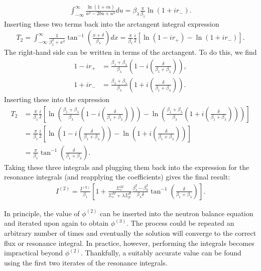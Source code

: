\begin{align}
  \int_{-\infty}^\infty \frac{\ln( 1 + iu)}{a^2 - 2bu + u^2} du  = \beta_\lambda \frac{\pi}{\beta_1} \ln( 1 + i r_- ) .
\end{align}
Inserting these two terms back into the arctangent integral expression
\begin{align}
  T_2 = \int_{-\infty}^\infty \frac{1}{\beta_1^2 + x^2} \tan^{-1} \left( \frac{x + \delta}{\beta_\lambda} \right) dx
  = \frac{\pi}{\beta_1} \frac{i}{2} \left[ \ln( 1 - i r_+ ) - \ln( 1 + i r_- ) \right] .
\end{align}
The right-hand side can be written in terms of the arctangent. To do this, we find
\begin{align}
  1 - i r_+ &= \frac{\beta_1 + \beta_\lambda}{\beta_\lambda} \left( 1 - i \left( \frac{\delta}{\beta_1 + \beta_\lambda} \right) \right), \nonumber \\
  1 + i r_- &= \frac{\beta_1 + \beta_\lambda}{\beta_\lambda} \left( 1 + i \left( \frac{\delta}{\beta_1 + \beta_\lambda} \right) \right). \nonumber
\end{align}
Inserting these into the expression
\begin{align}
  T_2 
  &= \frac{\pi}{\beta_1} \frac{i}{2} \left[ 
    \ln\left( \frac{\beta_1 + \beta_\lambda}{\beta_\lambda} \left( 1 - i \left( \frac{\delta}{\beta_1 + \beta_\lambda} \right) \right) \right)
  - \ln\left( \frac{\beta_1 + \beta_\lambda}{\beta_\lambda} \left( 1 + i \left( \frac{\delta}{\beta_1 + \beta_\lambda} \right) \right) \right)  \right] \nonumber \\
  &= \frac{\pi}{\beta_1} \frac{i}{2} \left[ 
    \ln\left( 1 - i \left( \frac{\delta}{\beta_1 + \beta_\lambda} \right) \right)
  - \ln\left( 1 + i \left( \frac{\delta}{\beta_1 + \beta_\lambda} \right) \right) \right] \nonumber \\
  &= \frac{\pi}{\beta_1} \tan^{-1} \left( \frac{\delta}{\beta_1 + \beta_\lambda} \right) .
\end{align}
Taking these three integrals and plugging them back into the expression for the resonance integrals (and reapplying the coefficients) gives the final result:
\begin{align}
  I^{(2)} = \frac{I^{(0)}}{\beta_1} 
  \left[ 1 + \frac{\Sigma_s^M}{\Sigma_s^M + \lambda \Sigma_p^R } \frac{  \beta_1^2 - \beta_0^2 }{ \beta_\lambda \delta } \tan^{-1} \left( \frac{\delta}{\beta_1 + \beta_\lambda} \right) \right] .
\end{align}

In principle, the value of $\phi^{(2)}$ can be inserted into the neutron balance equation and iterated upon again to obtain $\phi^{(3)}$. The process could be repeated an arbitrary number of times and eventually the solution will converge to the correct flux or resonance integral. In practice, however, performing the integrals becomes impractical beyond $\phi^{(2)}$. Thankfully, a suitably accurate value can be found using the first two iterates of the resonance integrals. 

